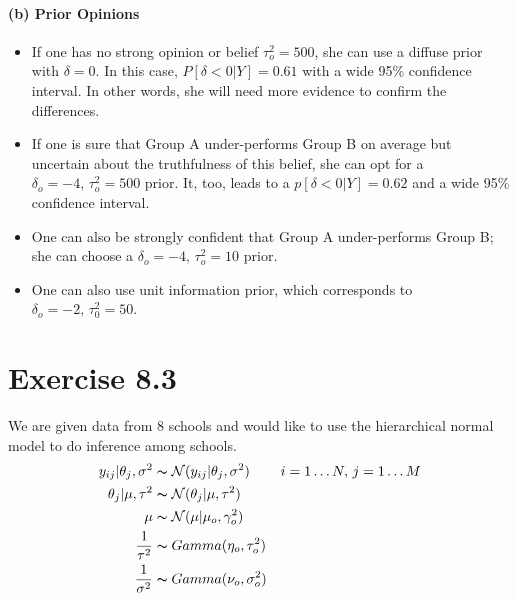 \documentclass[11pt, letterpaper]{article}
\begin{document}
\paragraph{(b) Prior Opinions}
\begin{itemize}
    \item If one has no strong opinion or belief $\tau^2_o=500$, she can use a diffuse prior with $\delta=0$. In this case, $P[\delta<0|Y] = 0.61$ with a wide 95\% confidence interval. In other words, she will need more evidence to confirm the differences.
    \item If one is sure that Group A under-performs Group B on average but uncertain about the truthfulness of this belief, she can opt for a $\delta_o=-4, \, \tau^2_o=500$ prior. It, too, leads to a $p[\delta<0|Y] = 0.62$ and a wide 95\% confidence interval.
    \item One can also be strongly confident that Group A under-performs Group B; she can choose a $\delta_o=-4, \, \tau_o^2=10$ prior.
    \item One can also use unit information prior, which corresponds to $\delta_o=-2, \, \tau_0^2=50$.
\end{itemize}



\section{Exercise 8.3}
We are given data from 8 schools and would like to use the hierarchical normal model to do inference among schools.
\begin{align*}
    y_{ij}|\theta_j, \sigma^2 &\thicksim \mathcal{N}(y_{ij}|\theta_j, \sigma^2) && i = 1\dots N, \, j = 1\dots M \\
    \theta_j|\mu, \tau^2 &\thicksim \mathcal{N}(\theta_j|\mu, \tau^2) \\
    \mu &\thicksim \mathcal{N}(\mu|\mu_o, \gamma_o^2) \\
    \frac{1}{\tau^2} &\thicksim Gamma(\eta_o, \tau_o^2) \\
    \frac{1}{\sigma^2} &\thicksim Gamma(\nu_o, \sigma^2_o) \\
\end{align*}
\end{document}
